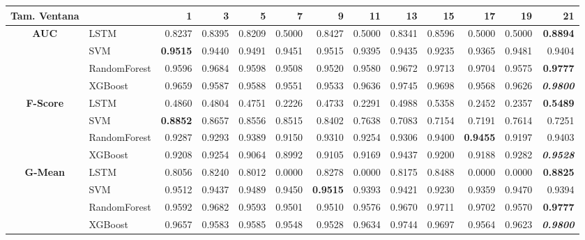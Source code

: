 \begin{table}[H]
	\centering
	\begin{adjustbox}{max width=12cm}
		\begin{tabular}{|c|l|r|r|r|r|r|r|r|r|r|r|r|}
			\hline
			\textbf{Tam. Ventana}&         &      1  &      3  &      5  &      7  &      9  &      11 &      13 &      15 &      17 &      19 &      21 \\
			\hline
			\textbf{AUC} &  LSTM &  0.8237 &  0.8395 &  0.8209 &  0.5000 &  0.8427 &  0.5000 &  0.8341 &  0.8596 &  0.5000 &  0.5000 & \textbf{  0.8894 } \\
			&  SVM & \textbf{  0.9515 } &  0.9440 &  0.9491 &  0.9451 &  0.9515 &  0.9395 &  0.9435 &  0.9235 &  0.9365 &  0.9481 &  0.9404 \\
			&  RandomForest &  0.9596 &  0.9684 &  0.9598 &  0.9508 &  0.9520 &  0.9580 &  0.9672 &  0.9713 &  0.9704 &  0.9575 & \textbf{  0.9777 } \\
			&  XGBoost &  0.9659 &  0.9587 &  0.9588 &  0.9551 &  0.9533 &  0.9636 &  0.9745 &  0.9698 &  0.9568 &  0.9626 & \textit{ \textbf{  0.9800 } } \\
			\hline
			\textbf{F-Score} &  LSTM &  0.4860 &  0.4804 &  0.4751 &  0.2226 &  0.4733 &  0.2291 &  0.4988 &  0.5358 &  0.2452 &  0.2357 & \textbf{  0.5489 } \\
			&  SVM & \textbf{  0.8852 } &  0.8657 &  0.8556 &  0.8515 &  0.8402 &  0.7638 &  0.7083 &  0.7154 &  0.7191 &  0.7614 &  0.7251 \\
			&  RandomForest &  0.9287 &  0.9293 &  0.9389 &  0.9150 &  0.9310 &  0.9254 &  0.9306 &  0.9400 & \textbf{  0.9455 } &  0.9197 &  0.9403 \\
			&  XGBoost &  0.9208 &  0.9254 &  0.9064 &  0.8992 &  0.9105 &  0.9169 &  0.9437 &  0.9200 &  0.9188 &  0.9282 & \textit{ \textbf{  0.9528 } } \\
			\hline
			\textbf{G-Mean} &  LSTM &  0.8056 &  0.8240 &  0.8012 &  0.0000 &  0.8278 &  0.0000 &  0.8175 &  0.8488 &  0.0000 &  0.0000 & \textbf{  0.8825 } \\
			&  SVM &  0.9512 &  0.9437 &  0.9489 &  0.9450 & \textbf{  0.9515 } &  0.9393 &  0.9421 &  0.9230 &  0.9359 &  0.9470 &  0.9394 \\
			&  RandomForest &  0.9592 &  0.9682 &  0.9593 &  0.9501 &  0.9510 &  0.9576 &  0.9670 &  0.9711 &  0.9702 &  0.9570 & \textbf{  0.9777 } \\
			&  XGBoost &  0.9657 &  0.9583 &  0.9585 &  0.9548 &  0.9528 &  0.9634 &  0.9744 &  0.9697 &  0.9564 &  0.9623 & \textit{ \textbf{  0.9800 } } \\

\end{tabular}
\end{adjustbox}
\end{table}
